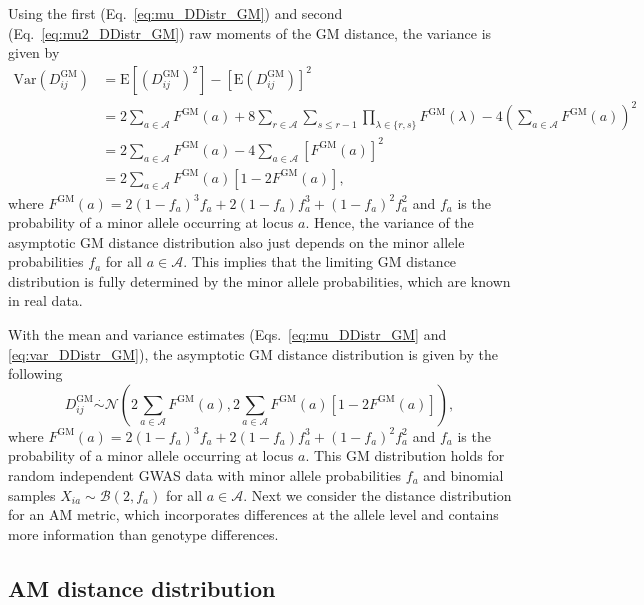 \documentclass[10pt,letterpaper]{article}
\begin{document}
Using the first (Eq.~\ref{eq:mu_DDistr_GM}) and second (Eq.~\ref{eq:mu2_DDistr_GM}) raw moments of the GM distance, the variance is given by
%
\begin{equation}\label{eq:var_DDistr_GM}
\begin{aligned}
\text{Var}\left(D^\text{GM}_{ij}\right) &= \text{E}\left[\left(D^\text{GM}_{ij}\right)^2\right] - \left[\text{E}\left(D^\text{GM}_{ij}\right)\right]^2 \\
&= 2\sum_{a \in \mathcal{A}} F^\text{GM}(a) + 8\sum_{r \in \mathcal{A}} \sum_{s \leq r - 1} \prod_{\lambda \in \{r,s\}} F^\text{GM}(\lambda) - 4\left(\sum_{a \in \mathcal{A}}F^\text{GM}(a)\right)^2 \\
&= 2\sum_{a \in \mathcal{A}} F^\text{GM}(a) - 4\sum_{a \in \mathcal{A}}\left[F^\text{GM}(a)\right]^2 \\
&= 2\sum_{a \in \mathcal{A}} F^\text{GM}(a)[1 - 2F^\text{GM}(a)],
\end{aligned}
\end{equation}
%
where $F^\text{GM}(a) = 2(1 - f_a)^3f_a + 2(1 - f_a)f^3_a + (1 - f_a)^2f^2_a$ and $f_a$ is the probability of a minor allele occurring at locus $a$. Hence, the variance of the asymptotic GM distance distribution also just depends on the minor allele probabilities $f_a$ for all $a \in \mathcal{A}$. This implies that the limiting GM distance distribution is fully determined by the minor allele probabilities, which are known in real data.

With the mean and variance estimates (Eqs.~\ref{eq:mu_DDistr_GM} and \ref{eq:var_DDistr_GM}), the asymptotic GM distance distribution is given by the following
%
\begin{equation}\label{eq:DDistr_GM}
D^\text{GM}_{ij} \overset{.}{\sim} \mathcal{N}\left(2\sum_{a \in \mathcal{A}} F^\text{GM}(a), 2\sum_{a \in \mathcal{A}} F^\text{GM}(a)[1 - 2F^\text{GM}(a)]\right),
\end{equation}
%
where $F^\text{GM}(a) = 2(1 - f_a)^3f_a + 2(1 - f_a)f^3_a + (1 - f_a)^2f^2_a$ and $f_a$ is the probability of a minor allele occurring at locus $a$. This GM distribution holds for random independent GWAS data with minor allele probabilities $f_a$ and binomial samples $X_{ia} \sim \mathcal{B}(2,f_a)$ for all $a \in \mathcal{A}$. Next we consider the distance distribution for an AM metric, which incorporates differences at the allele level and contains more information than genotype differences.

\subsection{AM distance distribution}
\end{document}
